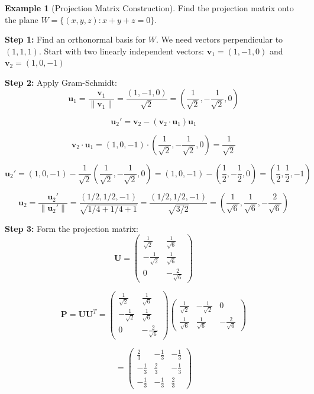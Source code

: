\documentclass[12pt]{article}
\numberwithin{equation}{section}
\newcommand{\vect}[1]{\boldsymbol{#1}}   %
\newcommand{\mat}[1]{\mathbf{#1}}        %
\theoremstyle{plain}
\theoremstyle{definition}
\newtheorem{example}[theorem]{Example}
\theoremstyle{remark}
\begin{document}
\begin{example}[Projection Matrix Construction]
Find the projection matrix onto the plane $W = \{(x, y, z) : x + y + z = 0\}$.

\textbf{Step 1:} Find an orthonormal basis for $W$.
We need vectors perpendicular to $(1, 1, 1)$. Start with two linearly independent vectors:
$\vect{v}_1 = (1, -1, 0)$ and $\vect{v}_2 = (1, 0, -1)$

\textbf{Step 2:} Apply Gram-Schmidt:
$$\vect{u}_1 = \frac{\vect{v}_1}{\|\vect{v}_1\|} = \frac{(1, -1, 0)}{\sqrt{2}} = \left(\frac{1}{\sqrt{2}}, -\frac{1}{\sqrt{2}}, 0\right)$$

$$\vect{u}_2' = \vect{v}_2 - (\vect{v}_2 \cdot \vect{u}_1)\vect{u}_1$$

$$\vect{v}_2 \cdot \vect{u}_1 = (1, 0, -1) \cdot \left(\frac{1}{\sqrt{2}}, -\frac{1}{\sqrt{2}}, 0\right) = \frac{1}{\sqrt{2}}$$

$$\vect{u}_2' = (1, 0, -1) - \frac{1}{\sqrt{2}}\left(\frac{1}{\sqrt{2}}, -\frac{1}{\sqrt{2}}, 0\right) = (1, 0, -1) - \left(\frac{1}{2}, -\frac{1}{2}, 0\right) = \left(\frac{1}{2}, \frac{1}{2}, -1\right)$$

$$\vect{u}_2 = \frac{\vect{u}_2'}{\|\vect{u}_2'\|} = \frac{(1/2, 1/2, -1)}{\sqrt{1/4 + 1/4 + 1}} = \frac{(1/2, 1/2, -1)}{\sqrt{3/2}} = \left(\frac{1}{\sqrt{6}}, \frac{1}{\sqrt{6}}, -\frac{2}{\sqrt{6}}\right)$$

\textbf{Step 3:} Form the projection matrix:
$$\mat{U} = \begin{pmatrix}
\frac{1}{\sqrt{2}} & \frac{1}{\sqrt{6}} \\
-\frac{1}{\sqrt{2}} & \frac{1}{\sqrt{6}} \\
0 & -\frac{2}{\sqrt{6}}
\end{pmatrix}$$

$$\mat{P} = \mat{U}\mat{U}^T = \begin{pmatrix}
\frac{1}{\sqrt{2}} & \frac{1}{\sqrt{6}} \\
-\frac{1}{\sqrt{2}} & \frac{1}{\sqrt{6}} \\
0 & -\frac{2}{\sqrt{6}}
\end{pmatrix}\begin{pmatrix}
\frac{1}{\sqrt{2}} & -\frac{1}{\sqrt{2}} & 0 \\
\frac{1}{\sqrt{6}} & \frac{1}{\sqrt{6}} & -\frac{2}{\sqrt{6}}
\end{pmatrix}$$

$$= \begin{pmatrix}
\frac{2}{3} & -\frac{1}{3} & -\frac{1}{3} \\
-\frac{1}{3} & \frac{2}{3} & -\frac{1}{3} \\
-\frac{1}{3} & -\frac{1}{3} & \frac{2}{3}
\end{pmatrix}$$


\end{example}
\end{document}
